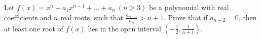 Let $f(x)=x^n+a_1x^{n-1}+\ldots+a_n~(n\ge3)$ be a polynomial with real coefficients and $n$ real roots, such that $\frac{a_{n-1}}{a_n}>n+1$. Prove that if $a_{n-2}=0$, then at least one root of $f(x)$ lies in the open interval $\left(-\frac12,\frac1{n+1}\right)$.